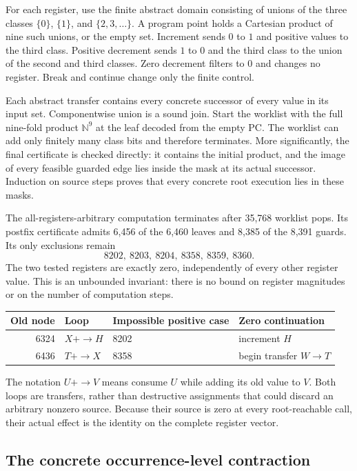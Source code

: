 For each register, use the finite abstract domain consisting of unions of
the three classes $\{0\}$, $\{1\}$, and $\{2,3,\ldots\}$.  A program
point holds a Cartesian product of nine such unions, or the empty set.
Increment sends $0$ to $1$ and positive values to the third class.
Positive decrement sends $1$ to $0$ and the third class to the union of
the second and third classes.  Zero decrement filters to $0$ and changes
no register.  Break and continue change only the finite control.

Each abstract transfer contains every concrete successor of every value
in its input set.  Componentwise union is a sound join.  Start the worklist
with the full nine-fold product $\mathbb N^9$ at the leaf decoded from the
empty PC.  The worklist can add only finitely many class bits and therefore
terminates.  More significantly, the final certificate is checked directly:
it contains the initial product, and the image of every feasible guarded
edge lies inside the mask at its actual successor.  Induction on source
steps proves that every concrete root execution lies in these masks.

The all-registers-arbitrary computation terminates after 35,768 worklist
pops.  Its postfix certificate admits 6,456 of the 6,460 leaves and 8,385
of the 8,391 guards.  Its only exclusions remain
\[
 8202,\ 8203,\ 8204,\ 8358,\ 8359,\ 8360.
\]
The two tested registers are exactly zero, independently of every other
register value.  This is an unbounded invariant: there is no bound on
register magnitudes or on the number of computation steps.

\begin{center}
\begin{tabular}{rlll}
Old node & Loop & Impossible positive case & Zero continuation\\
\hline
6324 & $X\mathrel{+\!\to}H$ & 8202 & increment $H$\\
6436 & $T\mathrel{+\!\to}X$ & 8358 & begin transfer $W\to T$
\end{tabular}
\end{center}

The notation $U\mathrel{+\!\to}V$ means consume $U$ while adding its
old value to $V$.  Both loops are transfers, rather than destructive
assignments that could discard an arbitrary nonzero source.  Because their
source is zero at every root-reachable call, their actual effect is the
identity on the complete register vector.

\subsection{The concrete occurrence-level contraction}

